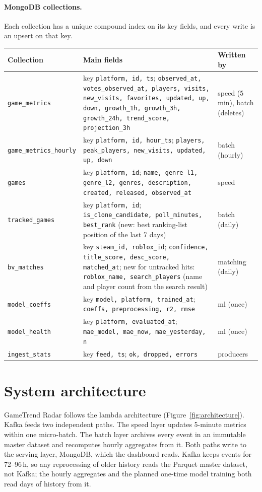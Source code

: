 \documentclass[10pt,a4paper]{article}
\newcommand{\ep}[1]{\texttt{\small #1}}
\begin{document}
\paragraph{MongoDB collections.} Each collection has a unique compound index on its key fields, and every write is an upsert on that key.

{\small
\begin{longtable}{L{3.0cm} L{9.6cm} L{2.9cm}}
\toprule
\textbf{Collection} & \textbf{Main fields} & \textbf{Written by}\\
\midrule\endhead
\ep{game\_metrics} & key \ep{platform, id, ts}; \ep{observed\_at, votes\_observed\_at, players, visits, new\_visits, favorites, updated, up, down, growth\_1h, growth\_3h, growth\_24h, trend\_score, projection\_3h} & speed (5\,min), batch (deletes)\\
\ep{game\_metrics\_hourly} & key \ep{platform, id, hour\_ts}; \ep{players, peak\_players, new\_visits, updated, up, down} & batch (hourly)\\
\ep{games} & key \ep{platform, id}; \ep{name, genre\_l1, genre\_l2, genres, description, created, released, observed\_at} & speed\\
\ep{tracked\_games} & key \ep{platform, id}; \ep{is\_clone\_candidate, poll\_minutes, best\_rank} (new: best ranking-list position of the last 7 days) & batch (daily)\\
\ep{bv\_matches} & key \ep{steam\_id, roblox\_id}; \ep{confidence, title\_score, desc\_score, matched\_at}; new for untracked hits: \ep{roblox\_name, search\_players} (name and player count from the search result) & matching (daily)\\
\ep{model\_coeffs} & key \ep{model, platform, trained\_at}; \ep{coeffs, preprocessing, r2, rmse} & ml (once)\\
\ep{model\_health} & key \ep{platform, evaluated\_at}; \ep{mae\_model, mae\_now, mae\_yesterday, n} & ml (once)\\
\ep{ingest\_stats} & key \ep{feed, ts}; \ep{ok, dropped, errors} & producers\\
\bottomrule
\end{longtable}}

\section{System architecture}\label{sec:architecture}
GameTrend Radar follows the lambda architecture (Figure~\ref{fig:architecture}). Kafka feeds two independent paths. The speed layer updates 5-minute metrics within one micro-batch. The batch layer archives every event in an immutable master dataset and recomputes hourly aggregates from it. Both paths write to the serving layer, MongoDB, which the dashboard reads. Kafka keeps events for 72--96\,h, so any reprocessing of older history reads the Parquet master dataset, not Kafka; the hourly aggregates and the planned one-time model training both read days of history from it.
\end{document}
